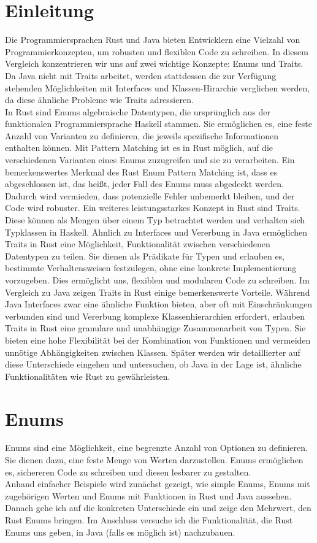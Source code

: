 \documentclass[a4paper, 1ppt]{article}
\begin{document}
\section{Einleitung}
Die Programmiersprachen Rust und Java bieten Entwicklern eine Vielzahl von Programmierkonzepten, um robusten und flexiblen Code zu schreiben. In diesem Vergleich konzentrieren wir uns auf zwei wichtige Konzepte: Enums und Traits. 
Da Java nicht mit Traits arbeitet, werden stattdessen die zur Verfügung stehenden Möglichkeiten mit Interfaces und Klassen-Hirarchie verglichen werden, da diese ähnliche Probleme wie Traits adressieren.\\
In Rust sind Enums algebraische Datentypen, die ursprünglich aus der funktionalen Programmiersprache Haskell stammen. Sie ermöglichen es, eine feste Anzahl von Varianten zu definieren, die jeweils spezifische Informationen enthalten können. Mit Pattern Matching ist es in Rust möglich, auf die verschiedenen Varianten eines Enums zuzugreifen und sie zu verarbeiten. Ein bemerkenswertes Merkmal des Rust Enum Pattern Matching ist, dass es abgeschlossen ist, das heißt, jeder Fall des Enums muss abgedeckt werden. Dadurch wird vermieden, dass potenzielle Fehler unbemerkt bleiben, und der Code wird robuster.
Ein weiteres leistungsstarkes Konzept in Rust sind Traits. Diese können als Mengen über einem Typ betrachtet werden und verhalten sich Typklassen in Haskell. Ähnlich zu Interfaces und Vererbung in Java ermöglichen Traits in Rust eine Möglichkeit, Funktionalität zwischen verschiedenen Datentypen zu teilen. Sie dienen als Prädikate für Typen\cite{rustslides} und erlauben es, bestimmte Verhaltensweisen festzulegen, ohne eine konkrete Implementierung vorzugeben. Dies ermöglicht uns, flexiblen und modularen Code zu schreiben.
Im Vergleich zu Java zeigen Traits in Rust einige bemerkenswerte Vorteile. Während Java Interfaces zwar eine ähnliche Funktion bieten, aber oft mit Einschränkungen verbunden sind und Vererbung komplexe Klassenhierarchien erfordert, erlauben Traits in Rust eine granulare und unabhängige Zusammenarbeit von Typen. Sie bieten eine hohe Flexibilität bei der Kombination von Funktionen und vermeiden unnötige Abhängigkeiten zwischen Klassen. Später werden wir detaillierter auf diese Unterschiede eingehen und untersuchen, ob Java in der Lage ist, ähnliche Funktionalitäten wie Rust zu gewährleisten.
\newpage
\section{Enums}
Enums sind eine Möglichkeit, eine begrenzte Anzahl von Optionen zu definieren. Sie dienen dazu, eine feste Menge von Werten darzustellen. Enums ermöglichen es, sichereren Code zu schreiben und diesen lesbarer zu gestalten.\\
Anhand einfacher Beispiele wird zunächst gezeigt, wie simple Enums, Enums mit zugehörigen Werten und Enums mit Funktionen in Rust und Java aussehen. Danach gehe ich auf die konkreten Unterschiede ein und zeige den Mehrwert, den Rust Enums bringen. 
Im Anschluss versuche ich die Funktionalität, die Rust Enums uns geben, in Java (falls es möglich ist) nachzubauen.
\end{document}
